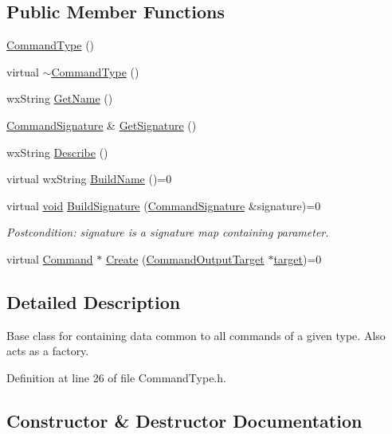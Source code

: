 \subsection*{Public Member Functions}
\begin{DoxyCompactItemize}
\item 
\hyperlink{class_command_type_a8e98ef31ccfd3951e1e6f2e27a014d6f}{Command\+Type} ()
\item 
virtual \hyperlink{class_command_type_a96ec8fe6f8c6c9019efb1c00d32191e0}{$\sim$\+Command\+Type} ()
\item 
wx\+String \hyperlink{class_command_type_a7f5045b8c8c9ffcd47fda211dd21f1c5}{Get\+Name} ()
\item 
\hyperlink{class_command_signature}{Command\+Signature} \& \hyperlink{class_command_type_a907bc9e2f9c860a77cb30718696e866d}{Get\+Signature} ()
\item 
wx\+String \hyperlink{class_command_type_aa6ade2691263d1ef885e6be8df72015f}{Describe} ()
\item 
virtual wx\+String \hyperlink{class_command_type_af54ee800a57cafb696885fdcf2557a71}{Build\+Name} ()=0
\item 
virtual \hyperlink{sound_8c_ae35f5844602719cf66324f4de2a658b3}{void} \hyperlink{class_command_type_ab2277b81355936015696d9e87d196718}{Build\+Signature} (\hyperlink{class_command_signature}{Command\+Signature} \&signature)=0
\begin{DoxyCompactList}\small\item\em Postcondition\+: signature is a \textquotesingle{}signature\textquotesingle{} map containing parameter. \end{DoxyCompactList}\item 
virtual \hyperlink{class_command}{Command} $\ast$ \hyperlink{class_command_type_aa56833afa01d531c76063ece5269ced9}{Create} (\hyperlink{class_command_output_target}{Command\+Output\+Target} $\ast$\hyperlink{lib_2expat_8h_a15a257516a87decb971420e718853137}{target})=0
\end{DoxyCompactItemize}


\subsection{Detailed Description}
Base class for containing data common to all commands of a given type. Also acts as a factory. 

Definition at line 26 of file Command\+Type.\+h.



\subsection{Constructor \& Destructor Documentation}
